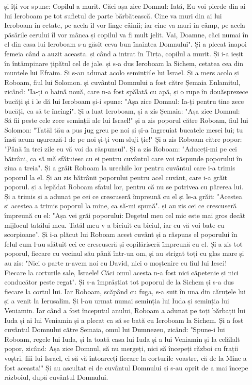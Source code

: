 și îți vor spune: Copilul a murit. Căci așa zice Domnul: Iată, Eu voi pierde din ai lui Ieroboam pe tot sufletul de parte bărbătească. Cine va muri din ai lui Ieroboam în cetate, pe acela îl vor linge câinii; iar cine va muri în câmp, pe acela păsările cerului îl vor mânca și copilul va fi mult jelit. Vai, Doamne, căci numai în el din casa lui Ieroboam s-a găsit ceva bun înaintea Domnului". Și a plecat înapoi femeia când a auzit aceasta. și când a intrat în Tirța, copilul a murit. Și i-a ieșit în întâmpinare țipătul cel de jale. și s-a dus Ieroboam la Sichem, cetatea cea din muntele lui Efraim. Și s-au adunat acolo semințiile lui Israel. Și a mers acolo și Roboam, fiul lui Solomon. și cuvântul Domnului a fost către Șemaia Enlamitul, zicând: "Ia-ți o haină nouă, care n-a fost spălată cu apă, și o rupe în douăsprezece bucăți și i le dă lui Ieroboam și-i spune: "Așa zice Domnul: Ia-ți pentru tine zece bucăți, ca să te încingi". Și a luat Ieroboam, și a zis Șemaia: "Așa zice Domnul: Să fii peste cele zece seminții ale lui Israel!" și a zis poporul către Roboam, fiul lui Solomon: "Tatăl tău a pus jug greu pe noi și și-a îngreuiat bucatele mesei lui; tu însă acum ușurează-l de pe noi și-ți vom sluji ție!" Și a zis Roboam către popor: "Până în trei zile eu vă voi da răspunsul". Și a zis Roboam: "Aduceți-mi pe cei bătrâni, ca să mă sfătuiesc cu ei pentru cuvântul care voi răspunde poporului în ziua a treia". Și a grăit Roboam la urechile lor pentru cuvântul care i-a trimis poporul la el. Și au zis bătrânii poporului pentru acel cuvânt, care i-a grăit poporul. și a lepădat Roboam sfatul lor, pentru că nu se potrivea cu părerea lui. Și a trimis și a adunat pe cei ce crescuseră împreună cu el și le-a grăit: "Acestea și acestea a trimis poporul la mine, ca să-mi spună". și au zis cei ce crescuseră împreună cu el: "Așa vei grăi poporului: Degetul meu cel mic este mai gros decât mijlocul tatălui meu. Tatăl meu v-a biciuit cu biciul, iar eu vă voi bate cu scorpioane". Și i-a plăcut lui Roboam acest cuvânt și a răspuns el poporului în felul cum l-au sfătuit cei ce crescuseră și copilăriseră împreună cu el. Și a zis tot poporul, fiecare cu vecinul său până într-un om, și au strigat toți cu glas mare și au zis: "Nici o parte n-avem noi cu David, nici o moștenire cu fiul lui Iesei! Fiecare la corturile sale, Israele! Căci omul acesta n-a fost nici căpetenie și nici conducător peste regat". Și s-a împrăștiat tot poporul de la Sichem și s-a dus fiecare la cortul lui. Iar Roboam, scăpând cu fuga, s-a suit în una din căruțele lui și a venit la Ierusalim. Și l-au urmat numai seminția lui Iuda și seminția lui Veniamin. Iar când a fost începutul anului, Roboam a adunat pe toți bărbații lui Iuda și ai lui Veniamin și a plecat ca să se bată cu Ieroboam la Sichem. Și a fost cuvântul Domnului către Șemaia, omul lui Dumnezeu, zicând: "Spune-i lui Roboam, regele lui Iuda, și la toată casa lui Iuda și a lui Veniamin și la celălalt popor, zicând: Așa zice Domnul, să nu mergeți, nici să începeți război cu frații voștri, fiii lui Israel, ci să vă întoarceți fiecare la corturile voastre, că de la Mine a fost aceasta!" Și au ascultat ei de cuvântul Domnului și s-au oprit de a mai începe războiul, după cuvântul Domnului.
